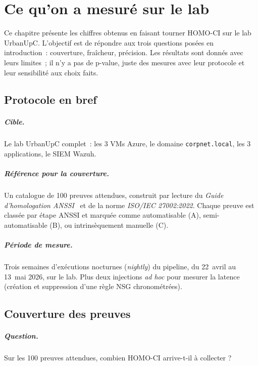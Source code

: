 \chapter{Ce qu'on a mesuré sur le lab}
\label{ch:resultats}

Ce chapitre présente les chiffres obtenus en faisant tourner
HOMO-CI sur le lab UrbanUpC. L'objectif est de répondre aux trois
questions posées en introduction~: couverture, fraîcheur,
précision. Les résultats sont donnés avec leurs limites~; il n'y
a pas de p-value, juste des mesures avec leur protocole et leur
sensibilité aux choix faits.

\section{Protocole en bref}

\paragraph{Cible.} Le lab UrbanUpC complet~: les 3 VMs Azure, le
domaine \texttt{corpnet.local}, les 3 applications, le SIEM
Wazuh.

\paragraph{Référence pour la couverture.} Un catalogue de 100
preuves attendues, construit par lecture du \emph{Guide
d'homologation ANSSI}~\cite{anssi-homologation-2014} et de la
norme \emph{ISO/IEC 27002:2022}. Chaque preuve est classée par
étape ANSSI et marquée comme automatisable (A), semi-automatisable
(B), ou intrinsèquement manuelle (C).

\paragraph{Période de mesure.} Trois semaines d'exécutions
nocturnes (\emph{nightly}) du pipeline, du 22~avril au 13~mai
2026, sur le lab. Plus deux injections \emph{ad hoc} pour
mesurer la latence (création et suppression d'une règle NSG
chronométrées).

\section{Couverture des preuves}

\paragraph{Question.} Sur les 100 preuves attendues, combien
HOMO-CI arrive-t-il à collecter ?

